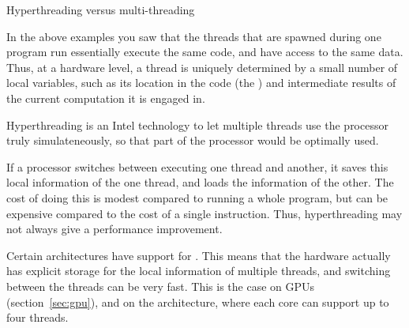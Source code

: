 {Hyperthreading versus multi-threading}
\label{sec:hyperthread}

In the above examples you saw that the threads that are spawned during one 
program run essentially execute the same code, and have access to the same data.
Thus, at a hardware level, a thread is uniquely determined by a small number of
local variables, such as its location in the code (the )
and intermediate results of the current computation it is engaged in.

Hyperthreading is an Intel technology to let multiple threads use the
processor truly simulateneously, so that part of the processor would
be optimally used.

If a processor switches between executing one thread and another, it saves this
local information of the one thread, and loads the information of the other.
The cost of doing this is modest compared to running a whole program, but 
can be expensive compared to the cost of a single instruction. Thus,
hyperthreading may not always give a performance improvement.

Certain architectures have support
for . This means that the hardware actually
has explicit storage for the local information of multiple threads,
and switching between the threads can be very fast. This is the case
on \acp{GPU} (section~\ref{sec:gpu}), and on
the  architecture, where each core can
support up to four threads.


